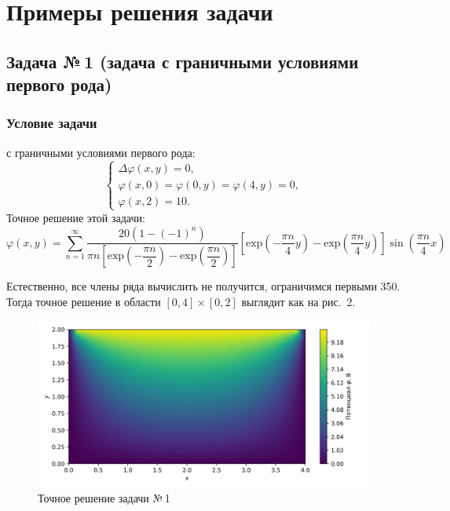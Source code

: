 \documentclass[12pt, a4paper]{article}
\begin{document}
		\newpage
		\section{Примеры решения задачи}
		
			\subsection{Задача №\,1 (задача с граничными условиями первого рода)}
				\subsubsection{Условие задачи}
					 с граничными условиями первого рода:
					\begin{equation*}
						\begin{cases}
							\Delta \varphi (x, y)  = 0, \\
							\varphi (x, 0) = \varphi (0, y) = \varphi (4, y) = 0, \\
							\varphi (x, 2) = 10.
						\end{cases}
					\end{equation*}
					Точное решение этой задачи:
					\begin{equation}
						\displaystyle
						\varphi\left(x, y\right) = \sum_{n = 1}^{\infty} \dfrac{20 \left(1 - (-1)^n \right)}{\pi n \left[ \mathrm{exp}\left({-\dfrac{\pi n}{2}}\right) - \mathrm{exp}\left({\dfrac{\pi n}{2}}\right)  \right]} \left[ \mathrm{exp}\left({-\dfrac{\pi n}{4}} y \right) -  \mathrm{exp}\left({\dfrac{\pi n}{4}} y \right)  \right] \sin{\left( \dfrac{\pi n}{4} x \right)}
						\label{exact_solution}
					\end{equation}	
					
					Естественно, все члены ряда вычислить не получится, ограничимся первыми 350. Тогда точное решение в области $\left[ 0 , 4\right] \times  \left[ 0 , 2\right]$ выглядит как на рис.~2.
					\begin{figure}[!h]
						\centering
						\includegraphics[width=1\textwidth]{rect_dirichlet_only_exact_sol.png}
						\caption{Точное решение задачи №\,1}
						\label{fig:rect_dom_dir_exact}
					\end{figure}
				
\end{document}
